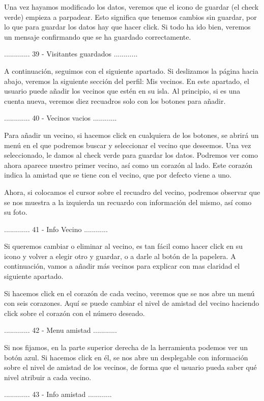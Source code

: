 Una vez hayamos modificado los datos, veremos que el icono de guardar (el check verde) empieza a parpadear.
Esto significa que tenemos cambios sin guardar, por lo que para guardar los datos hay que hacer click.
Si todo ha ido bien, veremos un mensaje confirmando que se ha guardado correctamente.

............. 39 - Visitantes guardados ............

A continuación, seguimos con el siguiente apartado. Si deslizamos la página hacia abajo, veremos la siguiente
sección del perfil: Mis vecinos. En este apartado, el usuario puede añadir los vecinos que estén en
su isla. Al principio, si es una cuenta nueva, veremos diez recuadros solo con los botones para añadir.

............. 40 - Vecinos vacios ............

Para añadir un vecino, si hacemos click en cualquiera de los botones, se abrirá un menú en el que 
podremos buscar y seleccionar el vecino que deseemos. Una vez seleccionado, le damos al check verde
para guardar los datos. Podremos ver como ahora aparece nuestro primer vecino, así como un corazón
al lado. Este corazón indica la amistad que se tiene con el vecino, que por defecto viene a uno.

Ahora, si colocamos el cursor sobre el recuadro del vecino, podremos observar que se nos muestra a la
izquierda un recuardo con información del mismo, así como su foto.

............. 41 - Info Vecino ............

Si queremos cambiar o eliminar al vecino, es tan fácil como hacer click en su icono y volver a elegir
otro y guardar, o a darle al botón de la papelera. A continuación, vamos a añadir más vecinos para
explicar con mas claridad el siguiente apartado.

Si hacemos click en el corazón de cada vecino, veremos que se nos abre un menú con seis corazones. 
Aquí se puede cambiar el nivel de amistad del vecino haciendo click sobre el corazón con el número
deseado.

............. 42 - Menu amistad ............

Si nos fijamos, en la parte superior derecha de la herramienta podemos ver un botón azul. Si hacemos click en él,
se nos abre un desplegable con información sobre el nivel de amistad de los vecinos, de forma que el 
usuario pueda saber qué nivel atribuir a cada vecino.

............. 43 - Info amistad ............

